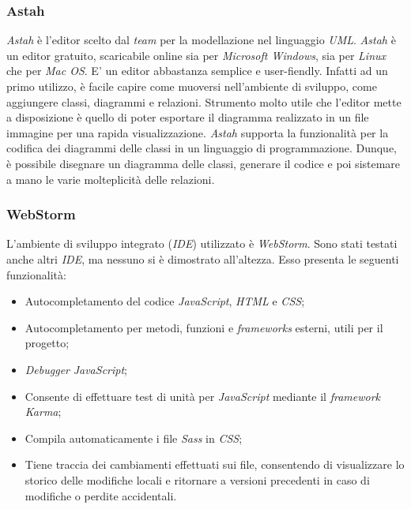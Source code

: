 \subsubsection{Astah}
\textit{Astah} è l'editor scelto dal \textit{team} per la modellazione nel linguaggio \textit{UML}.
\textit{Astah} è un editor gratuito, scaricabile online sia per \textit{Microsoft Windows}, sia per \textit{Linux} che per \textit{Mac OS}.
E' un editor abbastanza semplice e user-fiendly. Infatti ad un  primo utilizzo, è facile capire come muoversi nell'ambiente di sviluppo, come aggiungere classi, diagrammi e relazioni.
Strumento molto utile che l'editor mette a disposizione è quello di poter esportare il diagramma realizzato in un file immagine per una rapida visualizzazione.
\textit{Astah} supporta la funzionalità per la codifica dei diagrammi delle classi in un linguaggio di programmazione. Dunque, è possibile disegnare un diagramma delle classi, generare il codice e poi sistemare a mano le varie molteplicità delle relazioni.



\subsubsection{WebStorm}
L'ambiente di sviluppo integrato (\textit{IDE}) utilizzato è \textit{WebStorm}. Sono stati testati anche altri \textit{IDE}, ma nessuno si è dimostrato all'altezza. Esso presenta le seguenti funzionalità:
\begin{itemize}
\item
Autocompletamento del codice \textit{JavaScript}, \textit{HTML} e \textit{CSS};
\item
Autocompletamento per metodi, funzioni e \textit{frameworks} esterni, utili per il progetto;
\item
\textit{Debugger} \textit{JavaScript};
\item
Consente di effettuare test di unità per \textit{JavaScript} mediante il \textit{framework} \textit{Karma};
\item
Compila automaticamente i file \textit{Sass} in \textit{CSS};
\item
Tiene traccia dei cambiamenti effettuati sui file, consentendo di visualizzare lo storico delle modifiche locali e ritornare a versioni precedenti in caso di modifiche o perdite accidentali.
\end{itemize}


